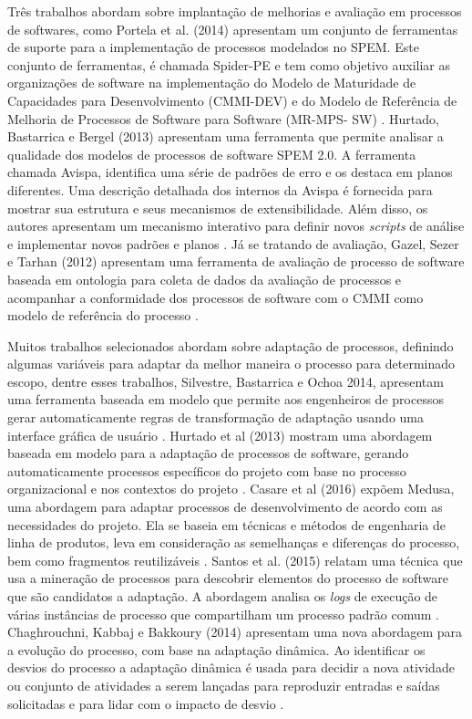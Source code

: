  
Três trabalhos abordam sobre implantação de melhorias e avaliação em processos de softwares, como Portela et al. (2014) apresentam um conjunto de ferramentas de suporte para a implementação de processos modelados no SPEM. Este conjunto de ferramentas, é chamada Spider-PE e tem como objetivo auxiliar as organizações de software na implementação do Modelo de Maturidade de Capacidades para Desenvolvimento (CMMI-DEV) e do Modelo de Referência de Melhoria de Processos de Software para Software (MR-MPS- SW) \cite{9portela:2014}. Hurtado, Bastarrica e Bergel (2013) apresentam uma ferramenta que permite analisar a qualidade dos modelos de processos de software SPEM 2.0. A ferramenta chamada Avispa, identifica uma série de padrões de erro e os destaca em planos diferentes. Uma descrição detalhada dos internos da Avispa é fornecida para mostrar sua estrutura e seus mecanismos de extensibilidade. Além disso, os autores apresentam um mecanismo interativo para definir novos \textit{scripts} de análise e implementar novos padrões e planos \cite{6hurtado:2013}. 
Já se tratando de avaliação, Gazel, Sezer e Tarhan (2012) apresentam uma ferramenta de avaliação de processo de software baseada em ontologia para coleta de dados da avaliação de processos e acompanhar a conformidade dos processos de software com o CMMI como modelo de referência do processo \cite{7gazel:2012}. 



Muitos trabalhos selecionados abordam sobre adaptação de processos, definindo algumas variáveis para adaptar da melhor maneira o processo para determinado escopo, dentre esses trabalhos, Silvestre, Bastarrica e Ochoa 2014, apresentam uma ferramenta baseada em modelo que permite aos engenheiros de processos gerar automaticamente regras de transformação de adaptação usando uma interface gráfica de usuário \cite{3silvestre:2014}. Hurtado et al (2013) mostram uma abordagem baseada em modelo para a adaptação de processos de software, gerando automaticamente processos específicos do projeto com base no processo organizacional e nos contextos do projeto \cite{11hurtado:2013}. Casare et al (2016) expõem Medusa, uma abordagem para adaptar processos de desenvolvimento de acordo com as necessidades do projeto. Ela se baseia em técnicas e métodos de engenharia de linha de produtos, leva em consideração as semelhanças e diferenças do processo, bem como fragmentos reutilizáveis \cite{16casare:2016}. Santos et al. (2015) relatam uma técnica que usa a mineração de processos para descobrir elementos do processo de software que são candidatos a adaptação. A abordagem analisa os \textit{logs} de execução de várias instâncias de processo que compartilham um processo padrão comum \cite{17santos:2015}. Chaghrouchni, Kabbaj e Bakkoury (2014) apresentam uma nova abordagem para a evolução do processo, com base na adaptação dinâmica. Ao identificar os desvios do processo a adaptação dinâmica é usada para decidir a nova atividade ou conjunto de atividades a serem lançadas para reproduzir entradas e saídas solicitadas e para lidar com o impacto de desvio \cite{18chaghrouchni:2014}.

